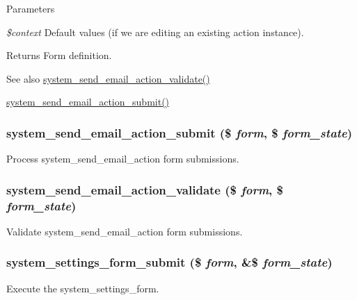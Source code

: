 \begin{DoxyParams}{Parameters}
\item[{\em \$context}]Default values (if we are editing an existing action instance).\end{DoxyParams}
\begin{DoxyReturn}{Returns}
Form definition.
\end{DoxyReturn}
\begin{DoxySeeAlso}{See also}
\hyperlink{system_8module_a667002aa61b3826726f5a2274d8f3f27}{system\_\-send\_\-email\_\-action\_\-validate()} 

\hyperlink{system_8module_aa51bb7d880590588296057b0f0b7c1ff}{system\_\-send\_\-email\_\-action\_\-submit()} 
\end{DoxySeeAlso}
\hypertarget{system_8module_aa51bb7d880590588296057b0f0b7c1ff}{
\subsubsection[{system\_\-send\_\-email\_\-action\_\-submit}]{\setlength{\rightskip}{0pt plus 5cm}system\_\-send\_\-email\_\-action\_\-submit (\$ {\em form}, \/  \$ {\em form\_\-state})}}
\label{system_8module_aa51bb7d880590588296057b0f0b7c1ff}
Process system\_\-send\_\-email\_\-action form submissions. \hypertarget{system_8module_a667002aa61b3826726f5a2274d8f3f27}{
\subsubsection[{system\_\-send\_\-email\_\-action\_\-validate}]{\setlength{\rightskip}{0pt plus 5cm}system\_\-send\_\-email\_\-action\_\-validate (\$ {\em form}, \/  \$ {\em form\_\-state})}}
\label{system_8module_a667002aa61b3826726f5a2274d8f3f27}
Validate system\_\-send\_\-email\_\-action form submissions. \hypertarget{system_8module_a1ac9556d37dcf1ec5836b0171757c610}{
\subsubsection[{system\_\-settings\_\-form\_\-submit}]{\setlength{\rightskip}{0pt plus 5cm}system\_\-settings\_\-form\_\-submit (\$ {\em form}, \/  \&\$ {\em form\_\-state})}}
\label{system_8module_a1ac9556d37dcf1ec5836b0171757c610}
Execute the system\_\-settings\_\-form.

